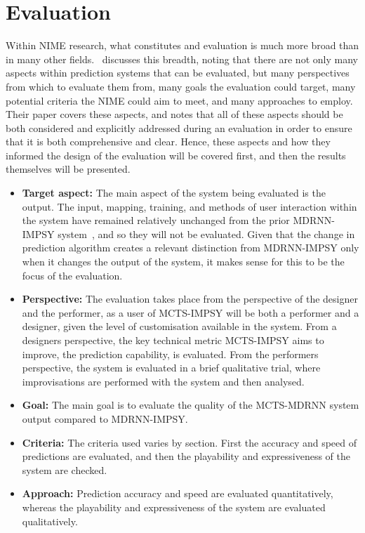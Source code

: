 \chapter{Evaluation}\label{chap:evaluation}
Within NIME research, what constitutes and evaluation is much more broad than in many other fields.~\cite{Barbosa2015EvaluationMeaning} discusses this breadth, noting that there are not only many aspects within prediction systems that can be evaluated, but many perspectives from which to evaluate them from, many goals the evaluation could target, many potential criteria the NIME could aim to meet, and many approaches to employ. Their paper covers these aspects, and notes that all of these aspects should be both considered and explicitly addressed during an evaluation in order to ensure that it is both comprehensive and clear. Hence, these aspects and how they informed the design of the evaluation will be covered first, and then the results themselves will be presented.

\begin{itemize}
    \item \textbf{Target aspect:} The main aspect of the system being evaluated is the output. The input, mapping, training, and methods of user interaction within the system have remained relatively unchanged from the prior MDRNN-IMPSY system~\citep{Martin2019IMPSY}, and so they will not be evaluated. Given that the change in prediction algorithm creates a relevant distinction from MDRNN-IMPSY only when it changes the output of the system, it makes sense for this to be the focus of the evaluation.
    \item \textbf{Perspective:} The evaluation takes place from the perspective of the designer and the performer, as a user of MCTS-IMPSY will be both a performer and a designer, given the level of customisation available in the system. From a designers perspective, the key technical metric MCTS-IMPSY aims to improve, the prediction capability, is evaluated. From the performers perspective, the system is evaluated in a brief qualitative trial, where improvisations are performed with the system and then analysed.
    \item \textbf{Goal:} The main goal is to evaluate the quality of the MCTS-MDRNN system output compared to MDRNN-IMPSY.
    \item \textbf{Criteria:} The criteria used varies by section. First the accuracy and speed of predictions are evaluated, and then the playability and expressiveness of the system are checked.
    \item \textbf{Approach:} Prediction accuracy and speed are evaluated quantitatively, whereas the playability and expressiveness of the system are evaluated qualitatively.
\end{itemize}

